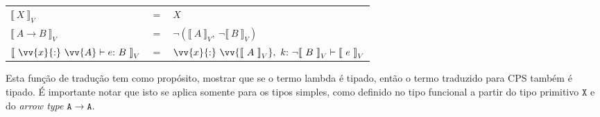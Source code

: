 \phantom{Newline}

\begin{tabular}{lcl}
     ${\llbracket\ X\ \rrbracket}_V$ & $=$ & $X$ \\ 
     ${\llbracket\ A \rightarrow B\ \rrbracket}_V$ & $=$ & $\neg({\llbracket\ A\ \rrbracket}_V,\ \neg{\llbracket\ B\ \rrbracket}_V)$ \\ 
     ${\llbracket\ \vv{x}{:}\ \vv{A} \vdash e{:}\ B\ \rrbracket}_V$ & $=$ & $\vv{x}{:}\ \vv{{\llbracket\ A\ \rrbracket}_V},\ k{:}\ \neg{\llbracket\ B\ \rrbracket}_V \vdash {\llbracket\ e\ \rrbracket}_V$ \\ 
\end{tabular}

\phantom{Newline}

\noindent Esta função de tradução tem como propósito, mostrar que se o termo lambda é tipado, então o termo traduzido para CPS também é tipado.
É importante notar que isto se aplica somente para os tipos simples, como definido no tipo funcional a partir do tipo primitivo $\mathtt{X}$ e do \textit{arrow type} $\mathtt{A \to A}$.
